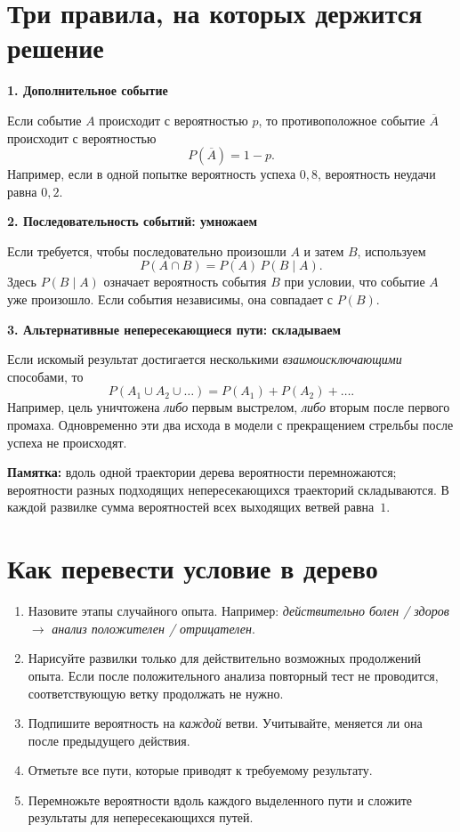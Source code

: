 \documentclass[a4paper,12pt]{article}
\newcommand{\smalltopic}[1]{\par\vspace{7pt}\noindent\textcolor{darkaccent}{\bfseries #1}\par\vspace{1pt}}
\newcommand{\important}[1]{\textcolor{darkaccent}{\bfseries #1}}
\begin{document}
\section{Три правила, на которых держится решение}
\smalltopic{1. Дополнительное событие}
Если событие $A$ происходит с вероятностью $p$, то противоположное событие $\overline A$ происходит с вероятностью
\[
P(\overline A)=1-p.
\]
Например, если в одной попытке вероятность успеха $0{,}8$, вероятность неудачи равна $0{,}2$.

\smalltopic{2. Последовательность событий: умножаем}
Если требуется, чтобы последовательно произошли $A$ и затем $B$, используем
\[
P(A\cap B)=P(A)\,P(B\mid A).
\]
Здесь $P(B\mid A)$ означает вероятность события $B$ при условии, что событие $A$ уже произошло. Если события независимы, она совпадает с $P(B)$.

\smalltopic{3. Альтернативные непересекающиеся пути: складываем}
Если искомый результат достигается несколькими \emph{взаимоисключающими} способами, то
\[
P(A_1\cup A_2\cup\dots)=P(A_1)+P(A_2)+\dots.
\]
Например, цель уничтожена \emph{либо} первым выстрелом, \emph{либо} вторым после первого промаха. Одновременно эти два исхода в модели с прекращением стрельбы после успеха не происходят.

\important{Памятка:} вдоль одной траектории дерева вероятности перемножаются; вероятности разных подходящих непересекающихся траекторий складываются. В каждой развилке сумма вероятностей всех выходящих ветвей равна~$1$.

\section{Как перевести условие в дерево}
\begin{enumerate}
\item Назовите этапы случайного опыта. Например: \emph{действительно болен / здоров} $\to$ \emph{анализ положителен / отрицателен}.
\item Нарисуйте развилки только для действительно возможных продолжений опыта. Если после положительного анализа повторный тест не проводится, соответствующую ветку продолжать не нужно.
\item Подпишите вероятность на \emph{каждой} ветви. Учитывайте, меняется ли она после предыдущего действия.
\item Отметьте все пути, которые приводят к требуемому результату.
\item Перемножьте вероятности вдоль каждого выделенного пути и сложите результаты для непересекающихся путей.
\end{enumerate}
\end{document}
